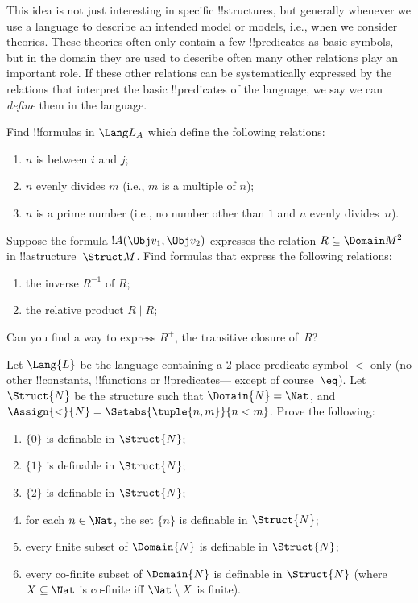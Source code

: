\begin{explain}
This idea is not just interesting in specific !!{structure}s, but
generally whenever we use a language to describe an intended model or
models, i.e., when we consider theories.  These theories often only
contain a few !!{predicate}s as basic symbols, but in the domain they
are used to describe often many other relations play an important
role.  If these other relations can be systematically expressed by the
relations that interpret the basic !!{predicate}s of the language, we
say we can \emph{define} them in the language.
\end{explain}

\begin{prob}
Find !!{formula}s in $\Lang L_A$ which define the following relations:
\begin{enumerate}
\item $n$ is between $i$ and $j$;
\item $n$ evenly divides $m$ (i.e., $m$ is a multiple of $n$);
\item $n$ is a prime number (i.e., no number other than $1$ and $n$ evenly
  divides~$n$).
\end{enumerate}
\end{prob}

\begin{prob}
Suppose the formula $!A(\Obj v_1, \Obj v_2)$ expresses the relation $R
\subseteq \Domain M^2$ in !!a{structure}~$\Struct M$.  Find formulas
that express the following relations:
\begin{enumerate}
\item the inverse $R^{-1}$ of $R$;
\item the relative product $R \mid R$;
\end{enumerate}
Can you find a way to express $R^+$, the transitive closure of~$R$?
\end{prob}

\begin{prob}
Let $\Lang{L}$ be the language containing a 2-place predicate symbol
$<$ only (no other !!{constant}s, !!{function}s or !!{predicate}s---
except of course~$\eq$). Let $\Struct{N}$ be the structure such that
$\Domain{N} = \Nat$, and $\Assign{<}{N} = \Setabs{\tuple{n,m}}{n <
  m}$. Prove the following:
\begin{enumerate}
\item $\{ 0 \}$ is definable in $\Struct{N}$;
\item $\{ 1 \}$ is definable in $\Struct{N}$;
\item $\{ 2 \}$ is definable in $\Struct{N}$;
\item for each $n \in \Nat$, the set $\{ n \}$ is definable in
  $\Struct{N}$;
\item every finite subset of $\Domain{N}$ is definable in
  $\Struct{N}$;
\item every co-finite subset of $\Domain{N}$ is definable in
  $\Struct{N}$ (where $X \subseteq \Nat$ is co-finite iff
  $\Nat \setminus X$ is finite).
\end{enumerate}
\end{prob}






